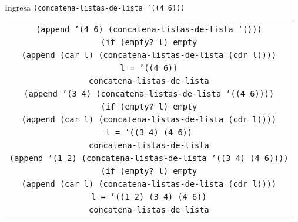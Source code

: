 \documentclass[letterpaper,11pt]{article}
\begin{document}
\begin{enumerate}
\begin{enumerate}
        Ingresa \texttt{(concatena-listas-de-lista '((4 6)))}
        \begin{center}
            \begin{tabular}{|c|}
                \hline
                \texttt{(append '(4 6) (concatena-listas-de-lista '()))} \\
                \texttt{(if (empty? l) empty} \\
                \texttt{(append (car l) (concatena-listas-de-lista (cdr l))))} \\
                \texttt{l = '((4 6))} \\
                \texttt{concatena-listas-de-lista} \\
                \hline
                \hline
                \texttt{(append '(3 4) 
                (concatena-listas-de-lista '((4 6))))}  \\
                \texttt{(if (empty? l) empty} \\
                \texttt{(append (car l) (concatena-listas-de-lista (cdr l))))} \\
                \texttt{l = '((3 4) (4 6))} \\
                \texttt{concatena-listas-de-lista} \\
                \hline
                \hline
                \texttt{(append '(1 2) 
                (concatena-listas-de-lista '((3 4) (4 6))))}  \\
                \texttt{(if (empty? l) empty} \\
                \texttt{(append (car l) (concatena-listas-de-lista (cdr l))))} \\
                \texttt{l = '((1 2) (3 4) (4 6))} \\
                \texttt{concatena-listas-de-lista} \\
                \hline
            \end{tabular}
        \end{center}


\end{enumerate}
\end{enumerate}
\end{document}
